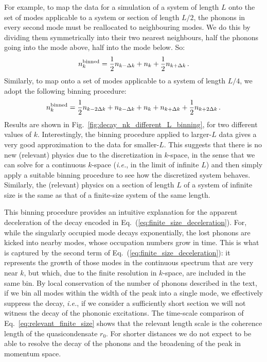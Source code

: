 \documentclass[aps,prd,notitlepage,amsfonts,amssymb,amsmath,nofootinbib,superscriptaddress,longbibliography]{revtex4-2}
\begin{document}
\begin{appendices}
 For example, to map the data for a simulation of a system of length $L$ onto the set of modes applicable to a system or section of length $L/2$, the phonons in every second mode must be reallocated to neighbouring modes.  We do this by dividing them symmetrically into their two nearest neighbours, half the phonons going into the mode above, half into the mode below.  So:
\begin{equation}
\label{eq:binning_once}
    n_{k}^{\rm binned} = \frac{1}{2} n_{k-\Delta k} + n_{k} + \frac{1}{2} n_{k+\Delta k} \,.
\end{equation}
Similarly, to map onto a set of modes applicable to a system of length $L/4$, we adopt the following binning procedure:
\begin{equation}
\label{eq:binning_twice}
    n_{k}^{\rm binned} = \frac{1}{2} n_{k-2\Delta k} + n_{k-\Delta k} + n_{k} + n_{k+\Delta k} + \frac{1}{2} n_{k+2\Delta k} \,. 
\end{equation}
Results are shown in Fig.~\ref{fig:decay_nk_different_L_binning}, for two different values of $k$.  Interestingly, the binning procedure applied to larger-$L$ data gives a very good approximation to the data for smaller-$L$.  This suggests that there is no new (relevant) physics due to the discretization in $k$-space, in the sense that we can solve for a continuous $k$-space ({\it i.e.}, in the limit of infinite $L$) and then simply apply a suitable binning procedure to see how the discretized system behaves.  Similarly, the (relevant) physics on a section of length $L$ of a system of infinite size is the same as that of a finite-size system of the same length.

This binning procedure provides an intuitive explanation for the apparent deceleration of the decay encoded in Eq.~(\ref{eq:finite_size_deceleration}).  For, while the singularly occupied mode decays exponentially, the lost phonons are kicked into nearby modes, whose occupation numbers grow in time.  This is what is captured by the second term of Eq.~(\ref{eq:finite_size_deceleration}): it represents the growth of those modes in the continuous spectrum that are very near $k$, but which, due to the finite resolution in $k$-space, are included in the same bin.
By local conservation of the number of phonons described in the text, if we bin all modes within the width of the peak into a single mode, we effectively suppress the decay, {\it i.e.}, if we consider a sufficiently short section we will not witness the decay of the phononic excitations. The time-scale comparison of Eq.~\eqref{eq:relevant_finite_size} shows that the relevant length scale is the coherence length of the quasicondensate $r_0$. For shorter distances we do not expect to be able to resolve the decay of the phonons and the broadening of the peak in momentum space.


\end{appendices}
\end{document}
